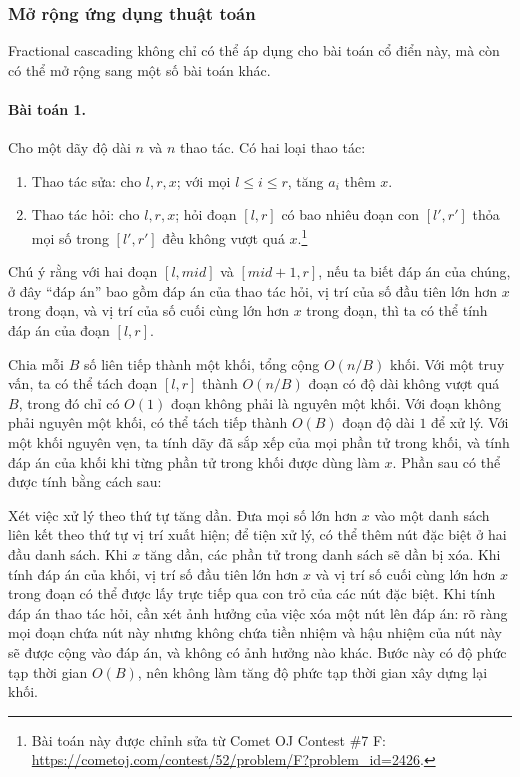 \documentclass[11pt]{article}
\begin{document}
\subsubsection{Mở rộng ứng dụng thuật toán}

Fractional cascading không chỉ có thể áp dụng cho bài toán cổ điển này, mà còn
có thể mở rộng sang một số bài toán khác.

\paragraph{Bài toán 1.}
Cho một dãy độ dài $n$ và $n$ thao tác. Có hai loại thao tác:

\begin{enumerate}
  \item Thao tác sửa: cho $l,r,x$; với mọi $l\le i\le r$, tăng $a_i$ thêm $x$.
  \item Thao tác hỏi: cho $l,r,x$; hỏi đoạn $[l,r]$ có bao nhiêu đoạn con
  $[l',r']$ thỏa mọi số trong $[l',r']$ đều không vượt quá $x$.\footnote{Bài
  toán này được chỉnh sửa từ Comet OJ Contest \#7 F:
  \url{https://cometoj.com/contest/52/problem/F?problem_id=2426}.}
\end{enumerate}

Chú ý rằng với hai đoạn $[l,\mathit{mid}]$ và $[\mathit{mid}+1,r]$, nếu ta biết
đáp án của chúng, ở đây ``đáp án'' bao gồm đáp án của thao tác hỏi, vị trí của
số đầu tiên lớn hơn $x$ trong đoạn, và vị trí của số cuối cùng lớn hơn $x$
trong đoạn, thì ta có thể tính đáp án của đoạn $[l,r]$.

Chia mỗi $B$ số liên tiếp thành một khối, tổng cộng $O(n/B)$ khối. Với một
truy vấn, ta có thể tách đoạn $[l,r]$ thành $O(n/B)$ đoạn có độ dài không vượt
quá $B$, trong đó chỉ có $O(1)$ đoạn không phải là nguyên một khối. Với đoạn
không phải nguyên một khối, có thể tách tiếp thành $O(B)$ đoạn độ dài $1$ để
xử lý. Với một khối nguyên vẹn, ta tính dãy đã sắp xếp của mọi phần tử trong
khối, và tính đáp án của khối khi từng phần tử trong khối được dùng làm $x$.
Phần sau có thể được tính bằng cách sau:

Xét việc xử lý theo thứ tự tăng dần. Đưa mọi số lớn hơn $x$ vào một danh sách
liên kết theo thứ tự vị trí xuất hiện; để tiện xử lý, có thể thêm nút đặc biệt
ở hai đầu danh sách. Khi $x$ tăng dần, các phần tử trong danh sách sẽ dần bị
xóa. Khi tính đáp án của khối, vị trí số đầu tiên lớn hơn $x$ và vị trí số cuối
cùng lớn hơn $x$ trong đoạn có thể được lấy trực tiếp qua con trỏ của các nút
đặc biệt. Khi tính đáp án thao tác hỏi, cần xét ảnh hưởng của việc xóa một nút
lên đáp án: rõ ràng mọi đoạn chứa nút này nhưng không chứa tiền nhiệm và hậu
nhiệm của nút này sẽ được cộng vào đáp án, và không có ảnh hưởng nào khác.
Bước này có độ phức tạp thời gian $O(B)$, nên không làm tăng độ phức tạp thời
gian xây dựng lại khối.
\end{document}
